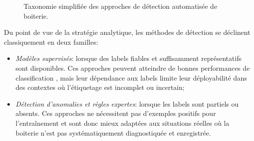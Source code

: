 \begin{figure}[H]
{%
    }
    \caption{Taxonomie simplifiée des approches de détection automatisée de boiterie.}
    \label{fig:taxonomie_approches}
\end{figure}

Du point de vue de la stratégie analytique, les méthodes de détection se déclinent
classiquement en deux familles:
\begin{itemize}
    \item[(a)] \textit{Modèles supervisés}: lorsque des labels fiables et suffisamment
    représentatifs sont disponibles. Ces approches peuvent atteindre de bonnes performances
    de classification
    \citep{vanhertem2014evaluation,viazzi2013analysis,blackie2011automatic}, mais leur
    dépendance aux labels limite leur déployabilité dans des contextes où l'étiquetage est
    incomplet ou incertain;
    \item[(b)] \textit{Détection d'anomalies et règles expertes}: lorsque les labels sont
    partiels ou absents. Ces approches ne nécessitent pas d'exemples positifs pour
    l'entraînement et sont donc mieux adaptées aux situations réelles où la boiterie n'est
    pas systématiquement diagnostiquée et enregistrée.
\end{itemize}

